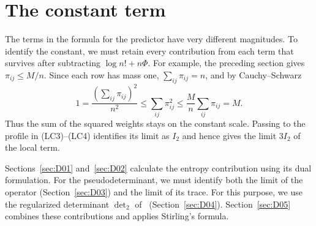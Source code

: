 \section{The constant term}\label{sec:constante}

The terms in the formula for the predictor have very different magnitudes. To identify the
constant, we must retain every contribution from each term that survives after subtracting $\log n!+n\Phi$.
For example, the preceding section gives $\pi_{ij}\le M/n$. Since each row has mass one,
$\sum_{ij}\pi_{ij}=n$, and by Cauchy--Schwarz
\[
 1=\frac{(\sum_{ij}\pi_{ij})^2}{n^2}
 \le \sum_{ij}\pi_{ij}^2
 \le \frac{M}{n}\sum_{ij}\pi_{ij}=M .
\]
Thus the sum of the squared weights stays on the constant scale.
Passing to the profile in (LC3)--(LC4) identifies its limit as $I_2$ and hence gives the limit $3I_2$ of the
local term.

Sections~\ref{sec:D01} and~\ref{sec:D02} calculate the entropy contribution using its
dual formulation. For the pseudodeterminant, we must identify both the limit of the operator
(Section~\ref{sec:D03}) and the limit of its trace. For this purpose, we use the regularized determinant
$\det_2$ of~\cite[Ch.~9]{Simon} (Section~\ref{sec:D04}). Section~\ref{sec:D05} combines these
contributions and applies Stirling's formula.
